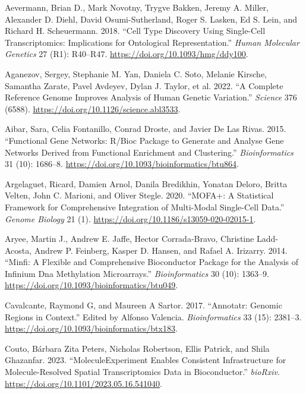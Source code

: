 \begin{thebibliography}{99.}%

Aevermann, Brian D., Mark Novotny, Trygve Bakken, Jeremy A. Miller, Alexander D. Diehl, David Osumi-Sutherland, Roger S. Lasken, Ed S. Lein, and Richard H. Scheuermann. 2018. ``Cell Type Discovery Using Single-Cell Transcriptomics: Implications for Ontological Representation.'' \emph{Human Molecular Genetics} 27 (R1): R40--R47. \url{https://doi.org/10.1093/hmg/ddy100}.

Aganezov, Sergey, Stephanie M. Yan, Daniela C. Soto, Melanie Kirsche, Samantha Zarate, Pavel Avdeyev, Dylan J. Taylor, et al. 2022. ``A Complete Reference Genome Improves Analysis of Human Genetic Variation.'' \emph{Science} 376 (6588). \url{https://doi.org/10.1126/science.abl3533}.

Aibar, Sara, Celia Fontanillo, Conrad Droste, and Javier De Las Rivas. 2015. ``Functional Gene Networks: R/Bioc Package to Generate and Analyse Gene Networks Derived from Functional Enrichment and Clustering.'' \emph{Bioinformatics} 31 (10): 1686--8. \url{https://doi.org/10.1093/bioinformatics/btu864}.

Argelaguet, Ricard, Damien Arnol, Danila Bredikhin, Yonatan Deloro, Britta Velten, John C. Marioni, and Oliver Stegle. 2020. ``MOFA+: A Statistical Framework for Comprehensive Integration of Multi-Modal Single-Cell Data.'' \emph{Genome Biology} 21 (1). \url{https://doi.org/10.1186/s13059-020-02015-1}.

Aryee, Martin J., Andrew E. Jaffe, Hector Corrada-Bravo, Christine Ladd-Acosta, Andrew P. Feinberg, Kasper D. Hansen, and Rafael A. Irizarry. 2014. ``Minfi: A Flexible and Comprehensive Bioconductor Package for the Analysis of Infinium Dna Methylation Microarrays.'' \emph{Bioinformatics} 30 (10): 1363--9. \url{https://doi.org/10.1093/bioinformatics/btu049}.

Cavalcante, Raymond G, and Maureen A Sartor. 2017. ``Annotatr: Genomic Regions in Context.'' Edited by Alfonso Valencia. \emph{Bioinformatics} 33 (15): 2381--3. \url{https://doi.org/10.1093/bioinformatics/btx183}.

Couto, Bárbara Zita Peters, Nicholas Robertson, Ellis Patrick, and Shila Ghazanfar. 2023. ``MoleculeExperiment Enables Consistent Infrastructure for Molecule-Resolved Spatial Transcriptomics Data in Bioconductor.'' \emph{bioRxiv}. \url{https://doi.org/10.1101/2023.05.16.541040}.


\end{thebibliography}
